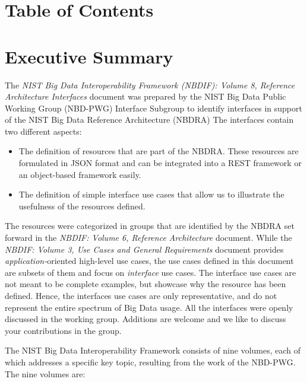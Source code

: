 \documentclass[9pt,]{article}
\begin{document}
\hypertarget{table-of-contents}{%
\section{Table of Contents}\label{table-of-contents}}

\hypertarget{executive-summary}{%
\section{Executive Summary}\label{executive-summary}}

The \emph{NIST Big Data Interoperability Framework (NBDIF): Volume 8,
Reference Architecture Interfaces} document was prepared by the NIST Big
Data Public Working Group (NBD-PWG) Interface Subgroup to identify
interfaces in support of the NIST Big Data Reference Architecture
(NBDRA) The interfaces contain two different aspects:

\begin{itemize}
\item
  The definition of resources that are part of the NBDRA. These
  resources are formulated in JSON format and can be integrated into a
  REST framework or an object-based framework easily.
\item
  The definition of simple interface use cases that allow us to
  illustrate the usefulness of the resources defined.
\end{itemize}

The resources were categorized in groups that are identified by the
NBDRA set forward in the \emph{NBDIF: Volume 6, Reference Architecture}
document. While the \emph{NBDIF: Volume 3, Use Cases and General
Requirements} document provides \emph{application-}oriented high-level
use cases, the use cases defined in this document are subsets of them
and focus on \emph{interface} use cases. The interface use cases are not
meant to be complete examples, but showcase why the resource has been
defined. Hence, the interfaces use cases are only representative, and do
not represent the entire spectrum of Big Data usage. All the interfaces
were openly discussed in the working group. Additions are welcome and we
like to discuss your contributions in the group.

The NIST Big Data Interoperability Framework consists of nine volumes,
each of which addresses a specific key topic, resulting from the work of
the NBD-PWG. The nine volumes are:
\end{document}
